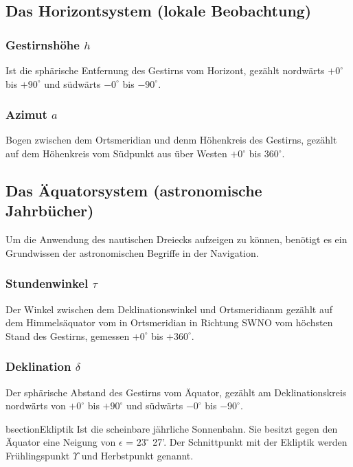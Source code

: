 \begin{refsection}
\subsection{Das Horizontsystem (lokale Beobachtung)}


\subsubsection{Gestirnshöhe $h$}
Ist die sphärische Entfernung des Gestirns vom Horizont, gezählt nordwärts $+0^{\circ}$ bis $+90^{\circ}$ und südwärts $-0^{\circ}$ bis $-90^{\circ}$.

\subsubsection{Azimut $a$}
Bogen zwischen dem Ortsmeridian und denm Höhenkreis des Gestirns, gezählt auf dem Höhenkreis vom Südpunkt aus über Westen $+0^{\circ}$ bis $360^{\circ}$.



\subsection{Das Äquatorsystem (astronomische Jahrbücher)}


Um die Anwendung des nautischen Dreiecks aufzeigen zu können, benötigt es ein Grundwissen der astronomischen Begriffe in der Navigation.


\subsubsection{Stundenwinkel $\tau$}
Der Winkel zwischen dem Deklinationswinkel und Ortsmeridianm gezählt auf dem Himmelsäquator vom in Ortsmeridian in Richtung SWNO vom höchsten Stand des Gestirns, gemessen $+0^{\circ}$ bis $+360^{\circ}$.


\subsubsection{Deklination $\delta$}
Der sphärische Abstand des Gestirns vom Äquator, gezählt am Deklinationskreis nordwärts von $+0^{\circ}$ bis $+90^{\circ}$ und südwärts $-0^{\circ}$ bis $-90^{\circ}$.










bsection{Ekliptik}
Ist die scheinbare jährliche Sonnenbahn. Sie besitzt gegen den Äquator eine Neigung von $\epsilon$ = $23^{\circ}$ 27'. Der Schnittpunkt mit der Ekliptik werden Frühlingspunkt $\Upsilon$ und Herbstpunkt genannt. 


\end{refsection}

